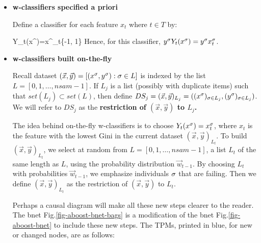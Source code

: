 \begin{itemize}
\item {\bf
w-classifiers specified a priori}

Define a classifier 
for each feature $x_t$ 
where $t\in T$ by:

\beq
Y_t(x^\s)=x^\s_t\in \{-1, 1\}
\eeq
Hence, for this classifier,
$y^\sigma Y_t (x^\sigma)=y^\sigma x_t^\sigma$.

\item {\bf w-classifiers built
on-the-fly}

Recall
dataset
$(\vec{x},\vec{y})=
[(x^\sigma, y^\sigma):\sigma\in L]$
is indexed by the  list
 $L=[0, 1, \ldots, nsam-1]$.
If
$L_j$ is a list (possibly with 
duplicate items)
such that $set(L_j)\subset set(L)$,
 then
define
$DS_j=(\vec{x}, \vec{y})_{L_j}=
((x^\sigma)_{\sigma\in L_j}, 
(y^\sigma)_{\sigma\in L_j})$.
We will
refer to $DS_j$
as the {\bf restriction of 
$(\vec{x}, \vec{y})$ to $L_j$.}

The idea 
behind on-the-fly
w-classifiers is to choose 
$Y_t(x^\sigma)=x_t^\sigma$,
where $x_t$
is the feature with the lowest
Gini in
the current dataset
$(\vec{x}, \vec{y})_{L_t}$.
To build 
$(\vec{x}, \vec{y})_{L_t}$,
we select at random 
from $L=[0, 1, \ldots, nsam-1]$,
a list $L_t$
of the same
length as $L$,
using the probability
distribution
$\vec{w}_{t-1}$.
By choosing
$L_t$
with
probabilities $\vec{w}_{t-1}$,
we emphasize 
individuals $\sigma$
that are failing.
Then
we define 
$(\vec{x},\vec{y})_{L_t}$
as the restriction of
$(\vec{x},\vec{y})$
to $L_t$.

Perhaps a causal diagram
will make all these 
new steps clearer
to the reader.
The bnet 
Fig.\ref{fig-aboost-bnet-bags}
is a modification of the
 bnet
Fig.\ref{fig-aboost-bnet}
to include these new steps.
The TPMs,
printed in blue,
for new or changed nodes, are as 
follows:




\end{itemize}
